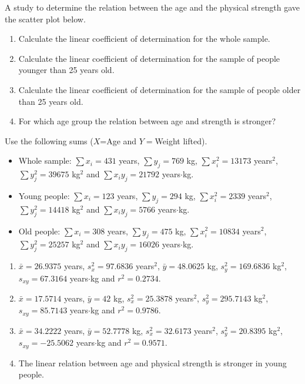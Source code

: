 {A study to determine the relation between the age and the physical strength gave the scatter plot below.
\begin{center}
\resizebox{0.7\textwidth}{!}{}
\end{center}

\begin{enumerate}
\item Calculate the linear coefficient of determination for the whole sample.
\item Calculate the linear coefficient of determination for the sample of people younger than 25 years old.
\item Calculate the linear coefficient of determination for the sample of people older than 25 years old.
\item For which age group the relation between age and strength is stronger?
\end{enumerate}

Use the following sums ($X$=Age and $Y=$Weight lifted).
\begin{itemize}[label=--]
\item Whole sample: $\sum x_i=431$ years, $\sum y_j=769$ kg, $\sum x_i^2=13173$ years$^2$, $\sum y_j^2=39675$
kg$^2$ and $\sum x_iy_j=21792$ years$\cdot$kg.
\item Young people: $\sum x_i=123$ years, $\sum y_j=294$ kg, $\sum x_i^2=2339$ years$^2$, $\sum y_j^2=14418$
kg$^2$ and $\sum x_iy_j=5766$ years$\cdot$kg.
\item Old people: $\sum x_i=308$ years, $\sum y_j=475$ kg, $\sum x_i^2=10834$ years$^2$, $\sum y_j^2=25257$
kg$^2$ and $\sum x_iy_j=16026$ years$\cdot$kg.
\end{itemize}
}
{
\begin{enumerate}
\item  $\bar{x}=26.9375$ years, $s_x^2=97.6836$ years$^2$, $\bar{y}=48.0625$ kg, $s_y^2=169.6836$ kg$^2$, $s_{xy}=67.3164$ years$\cdot$kg and $r^2=0.2734$.
\item $\bar x=17.5714$ years, $\bar y=42$ kg, $s_x^2=25.3878$ years$^2$, $s_y^2=295.7143$ kg$^2$, $s_{xy}=85.7143$ years$\cdot$kg and $r^2=0.9786$.
\item $\bar x=34.2222$ years, $\bar y=52.7778$ kg, $s_x^2=32.6173$ years$^2$, $s_y^2=20.8395$ kg$^2$,
$s_{xy}=-25.5062$ years$\cdot$kg and $r^2=0.9571$.
\item The linear relation between age and physical strength is stronger in young people.
\end{enumerate}
}
{}


